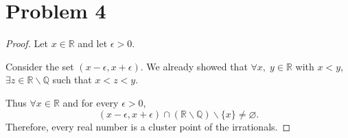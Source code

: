 \documentclass{article}
\newcommand{\R}{\mathbb{R}} %
\newcommand{\Q}{\mathbb{Q}} %
\begin{document}
\section*{Problem 4}
\begin{proof}
	Let $x \in \R$ and let $\epsilon > 0$. 
	
	Consider the set $(x - \epsilon, x + \epsilon)$. We already showed that $\forall x,\;y \in \R$ with $x < y$, $\exists z \in \R \backslash \Q$ such that $x < z < y$.
	
	Thus $\forall x \in \R$ and for every $\epsilon > 0$,
	\begin{equation}
		(x - \epsilon, x + \epsilon) \cap (\R \backslash \Q) \backslash \{x\} \neq \varnothing.
	\end{equation}
	Therefore, every real number is a cluster point of the irrationals.
\end{proof}
\end{document}

